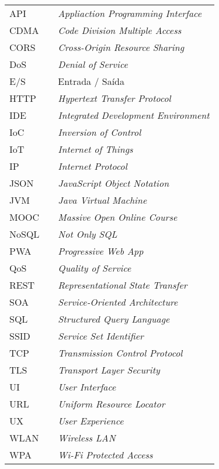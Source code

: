 \begin{table}[H]
\centering
\label{my-label}
\begin{tabular}{lll}
API   &  & \textit{Appliaction Programming Interface}                \\
CDMA  &  & \textit{Code Division Multiple Access}                    \\
CORS  &  & \textit{Cross-Origin Resource Sharing}                    \\
DoS   &  & \textit{Denial of Service}                                \\
E/S   &  & Entrada / Saída                                           \\
HTTP  &  & \textit{Hypertext Transfer Protocol}                      \\
IDE   &  & \textit{Integrated Development Environment}               \\
IoC   &  & \textit{Inversion of Control}                             \\
IoT   &  & \textit{Internet of Things}                               \\
IP    &  & \textit{Internet Protocol}                                \\
JSON  &  & \textit{JavaScript Object Notation}                       \\
JVM   &  & \textit{Java Virtual Machine}                             \\
MOOC  &  & \textit{Massive Open Online Course}                       \\
NoSQL &  & \textit{Not Only SQL}                                     \\
PWA   &  & \textit{Progressive Web App}                              \\
QoS   &  & \textit{Quality of Service}                               \\
REST  &  & \textit{Representational State Transfer}                  \\
SOA   &  & \textit{Service-Oriented Architecture}                    \\
SQL   &  & \textit{Structured Query Language}                        \\
SSID  &  & \textit{Service Set Identifier}                           \\
TCP   &  & \textit{Transmission Control Protocol}                    \\
TLS   &  & \textit{Transport Layer Security}                         \\
UI    &  & \textit{User Interface}                                   \\
URL   &  & \textit{Uniform Resource Locator}                         \\
UX    &  & \textit{User Experience}                                  \\
WLAN  &  & \textit{Wireless LAN}                                     \\
WPA   &  & \textit{Wi-Fi Protected Access}
\end{tabular}
\end{table}
